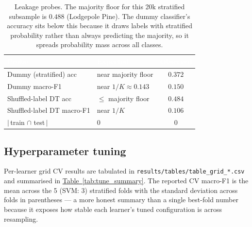 \documentclass[conference]{IEEEtran}
\newcommand{\tabref}[1]{\hyperref[#1]{\textcolor{sage}{Table~\ref*{#1}}}}
\begin{document}
\begin{table}[t]\centering
\caption{Leakage probes. The majority floor for this 20k stratified subsample
is $0.488$ (Lodgepole Pine). The dummy classifier's accuracy sits below this
because it draws labels with stratified probability rather than always
predicting the majority, so it spreads probability mass across all classes.}
\label{tab:leakage}
\centering\small
{}
\begin{tabularx}{\linewidth}{lXc}
\toprule
\rowcolor{denimdark}
\textcolor{white}{\textbf{Probe}} &
\textcolor{white}{\textbf{Expected}} &
\textcolor{white}{\textbf{Observed}} \\
\midrule
Dummy (stratified) acc        & near majority floor & $0.372$ \\
Dummy macro-F1                & near $1/K \approx 0.143$ & $0.150$ \\
Shuffled-label DT acc         & $\leq$ majority floor & $0.484$ \\
Shuffled-label DT macro-F1    & near $1/K$            & $0.106$ \\
$|\,$train $\cap$ test$\,|$   & 0                     & $0$ \\
\bottomrule
\end{tabularx}
\end{table}

\subsection{Hyperparameter tuning}\label{sec:exp:tune}
Per-learner grid CV results are tabulated in
\texttt{results/tables/table\_grid\_*.csv} and summarised in
\tabref{tab:tune_summary}. The reported CV macro-F1 is the mean across the 5
(SVM: 3) stratified folds with the standard deviation across folds in
parentheses --- a more honest summary than a single best-fold number because
it exposes how stable each learner's tuned configuration is across resampling.
\end{document}
